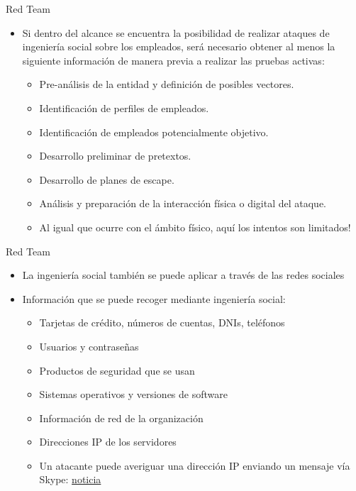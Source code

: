 \documentclass[aspectratio=169,11pt]{beamer}
\begin{document}
\begin{frame}[allowframebreaks]{Red Team}
\small
  \begin{itemize}
  \item Si dentro del alcance se encuentra la posibilidad de realizar ataques de ingeniería social sobre los empleados, será necesario obtener al menos la siguiente información de manera previa a realizar las pruebas activas:
    \begin{itemize}

  \item Pre-análisis de la entidad y definición de posibles vectores.
  \item Identificación de perfiles de empleados.
  \item Identificación de empleados potencialmente objetivo.
  \item Desarrollo preliminar de pretextos.
  \item Desarrollo de planes de escape.
  \item Análisis y preparación de la interacción física o digital del ataque.
  \item Al igual que ocurre con el ámbito físico, aquí los intentos son limitados!
    \end{itemize}

  \end{itemize}
\end{frame}

\begin{frame}[allowframebreaks]{Red Team}
\small
  \begin{itemize}
  \item La ingeniería social también se puede aplicar a través de las redes sociales
  \item Información que se puede recoger mediante ingeniería social:
    \begin{itemize}
    \item Tarjetas de crédito, números de cuentas, DNIs, teléfonos
    \item Usuarios y contraseñas
    \item Productos de seguridad que se usan
    \item Sistemas operativos y versiones de software
    \item Información de red de la organización
    \item Direcciones IP de los servidores
      \item Un atacante puede averiguar una dirección IP enviando un mensaje vía Skype: \href{https://securityaffairs.com/150000/hacking/grabbing-ip-addr-via-skype-mobile-app.html}{noticia}
    \end{itemize}
  \end{itemize}
\end{frame}
\end{document}
